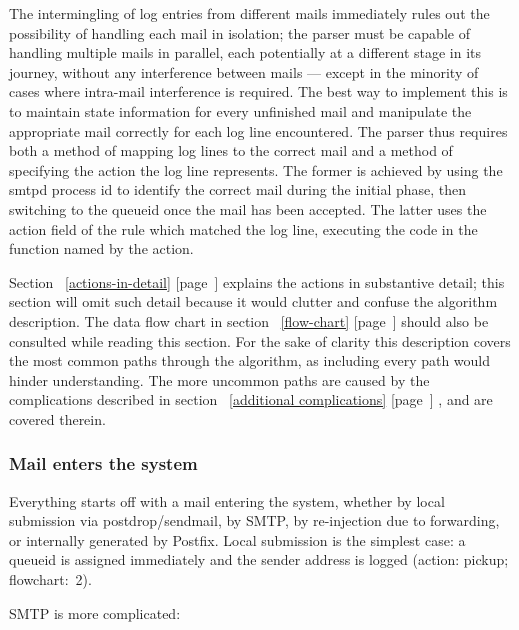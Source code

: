 \documentclass[a4paper,12pt,draft]{article}
\newcommand{\refwithpage}[1]{%
    \empty{}\ref{#1} [page~\pageref{#1}]%
}
\begin{document}
\label{full-algorithm}

The intermingling of log entries from different mails immediately rules out
the possibility of handling each mail in isolation; the parser must be
capable of handling multiple mails in parallel, each potentially at a
different stage in its journey, without any interference between mails ---
except in the minority of cases where intra-mail interference is required.
The best way to implement this is to maintain state information for every
unfinished mail and manipulate the appropriate mail correctly for each log
line encountered.  The parser thus requires both a method of mapping log
lines to the correct mail and a method of specifying the action the log
line represents.  The former is achieved by using the smtpd process id to
identify the correct mail during the initial phase, then switching to the
queueid once the mail has been accepted.  The latter uses the action field
of the rule which matched the log line, executing the code in the function
named by the action.

Section~\refwithpage{actions-in-detail} explains the actions in substantive
detail; this section will omit such detail because it would clutter and
confuse the algorithm description.  The data flow chart in
section~\refwithpage{flow-chart} should also be consulted while reading
this section.  For the sake of clarity this description covers the most
common paths through the algorithm, as including every path would hinder
understanding.  The more uncommon paths are caused by the complications
described in section~\refwithpage{additional complications}, and are
covered therein.

\subsubsection{Mail enters the system}

\label{mail-enters-the-system}

Everything starts off with a mail entering the system, whether by local
submission via postdrop/sendmail, by SMTP, by re-injection due to
forwarding, or internally generated by Postfix.  Local submission is the
simplest case: a queueid is assigned immediately and the sender address is
logged (action: pickup; flowchart:~2).

SMTP is more complicated: 
\end{document}

